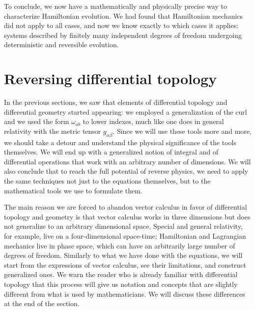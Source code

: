 To conclude, we now have a mathematically and physically precise way to characterize Hamiltonian evolution. We had found that Hamiltonian mechanics did not apply to all cases, and now we know exactly to which cases it applies: systems described by finitely many independent degrees of freedom undergoing deterministic and reversible evolution.

\section{Reversing differential topology}

In the previous sections, we saw that elements of differential topology and differential geometry started appearing: we employed a generalization of the curl and we used the form $\omega_{ab}$ to lower indexes, much like one does in general relativity with the metric tensor $g_{\alpha\beta}$. Since we will use these tools more and more, we should take a detour and understand the physical significance of the tools themselves. We will end up with a generalized notion of integral and of differential operations that work with an arbitrary number of dimensions. We will also conclude that to reach the full potential of reverse physics, we need to apply the same techniques not just to the equations themselves, but to the mathematical tools we use to formulate them.

The main reason we are forced to abandon vector calculus in favor of differential topology and geometry is that vector calculus works in three dimensions but does not generalize to an arbitrary dimensional space. Special and general relativity, for example, live on a four-dimensional space-time; Hamiltonian and Lagrangian mechanics live in phase space, which can have an arbitrarily large number of degrees of freedom. Similarly to what we have done with the equations, we will start from the expressions of vector calculus, see their limitations, and construct generalized ones. We warn the reader who is already familiar with differential topology that this process will give us notation and concepts that are slightly different from what is used by mathematicians. We will discuss these differences at the end of the section.

